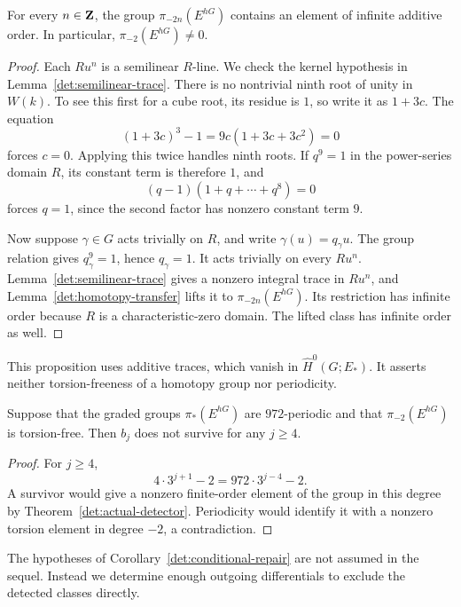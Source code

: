\begin{proposition}\label{det:full-gap}
For every \(n\in\mathbf Z\), the group
\(\pi_{-2n}(E^{hG})\) contains an element of infinite additive order.
In particular, \(\pi_{-2}(E^{hG})\ne0\).
\end{proposition}

\begin{proof}
Each \(Ru^n\) is a semilinear \(R\)-line.  We check the kernel
hypothesis in Lemma~\ref{det:semilinear-trace}.
There is no nontrivial ninth root of unity in \(W(k)\).
To see this first for a cube root, its residue is \(1\), so write it
as \(1+3c\).  The equation
\[
 (1+3c)^3-1=9c(1+3c+3c^2)=0
\]
forces \(c=0\).  Applying this twice handles ninth roots.
If \(q^9=1\) in the power-series domain \(R\), its constant term is
therefore \(1\), and
\[
 (q-1)(1+q+\cdots+q^8)=0
\]
forces \(q=1\), since the second factor has nonzero constant term
\(9\).

Now suppose \(\gamma\in G\) acts trivially on \(R\), and write
\(\gamma(u)=q_\gamma u\).
The group relation gives \(q_\gamma^9=1\), hence \(q_\gamma=1\).
It acts trivially on every \(Ru^n\).
Lemma~\ref{det:semilinear-trace} gives a nonzero integral trace in
\(Ru^n\), and Lemma~\ref{det:homotopy-transfer} lifts it to
\(\pi_{-2n}(E^{hG})\).
Its restriction has infinite order because \(R\) is a
characteristic-zero domain.  The lifted class has infinite order
as well.
\end{proof}

This proposition uses additive traces, which vanish in
\(\widehat H^0(G;E_*)\).  It asserts neither torsion-freeness of a
homotopy group nor periodicity.

\begin{corollary}\label{det:conditional-repair}
Suppose that the graded groups \(\pi_*(E^{hG})\) are
\(972\)-periodic and that \(\pi_{-2}(E^{hG})\) is
torsion-free.  Then \(b_j\) does not survive for any
\(j\geq4\).
\end{corollary}

\begin{proof}
For \(j\geq4\),
\[
 4\cdot3^{j+1}-2=972\cdot3^{j-4}-2.
\]
A survivor would give a nonzero finite-order element of the
group in this degree by Theorem~\ref{det:actual-detector}.
Periodicity would identify it with a nonzero torsion element
in degree \(-2\), a contradiction.
\end{proof}

The hypotheses of Corollary~\ref{det:conditional-repair} are not
assumed in the sequel.  Instead we determine enough outgoing
differentials to exclude the detected classes directly.

